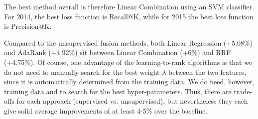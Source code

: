 \begin{table}[h!]
\centering
\caption{Comparison between the best fusion methods --- absolute P@10 percent improvements for each of the four query runs
(Summaries 2014, Descriptions 2014, Summaries 2015, Descriptions 2015).}
\label{fusion-comp}
\end{table}

The best method overall is therefore Linear Combination using an SVM classifier. For 2014, the best loss function
is Recall@K, while for 2015 the best loss function is Precision@K.

Compared to the unsupervised fusion methods, both Linear Regression (+5.08\%) and AdaRank (+4.92\%) sit between
Linear Combination (+6\%) and RRF (+4.75\%). Of course, one advantage of the learning-to-rank algorithms
is that we do not need to manually search for the best weight $\lambda$ between the two features,
since it is automatically determined
from the training data.
We do need, however, training data and to search for the best hyper-parameters.
Thus, there are trade-offs for each approach (supervised vs. unsupervised),
but nevertheless they each give solid average improvements of at least 4-5\% over the baseline.

